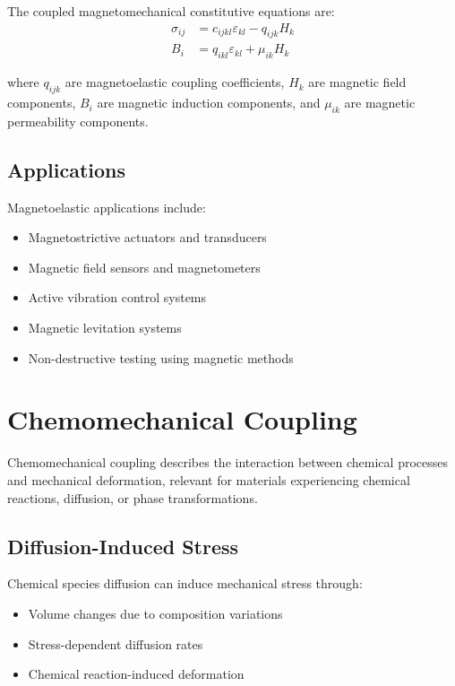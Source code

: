 The coupled magnetomechanical constitutive equations are:
\begin{align}
\sigma_{ij} &= c_{ijkl} \varepsilon_{kl} - q_{ijk} H_k\\
B_i &= q_{ikl} \varepsilon_{kl} + \mu_{ik} H_k
\end{align}

where $q_{ijk}$ are magnetoelastic coupling coefficients, $H_k$ are magnetic field components, $B_i$ are magnetic induction components, and $\mu_{ik}$ are magnetic permeability components.

\subsection{Applications}

Magnetoelastic applications include:
\begin{itemize}
\item Magnetostrictive actuators and transducers
\item Magnetic field sensors and magnetometers
\item Active vibration control systems
\item Magnetic levitation systems
\item Non-destructive testing using magnetic methods
\end{itemize}

\section{Chemomechanical Coupling}

Chemomechanical coupling describes the interaction between chemical processes and mechanical deformation, relevant for materials experiencing chemical reactions, diffusion, or phase transformations.

\subsection{Diffusion-Induced Stress}

Chemical species diffusion can induce mechanical stress through:
\begin{itemize}
\item Volume changes due to composition variations
\item Stress-dependent diffusion rates
\item Chemical reaction-induced deformation
\end{itemize}

